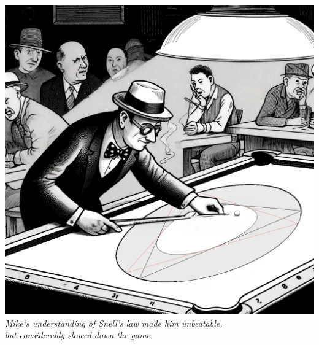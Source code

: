 \vspace{2em}
\begin{center}
    \includegraphics[height=10\baselineskip]{07_BilliardsConicsPorism/BILLIARDS1.png}\\
    {\small\textit{Mike's understanding of Snell's law made him unbeatable,\\ but considerably slowed down the game}}
\end{center}